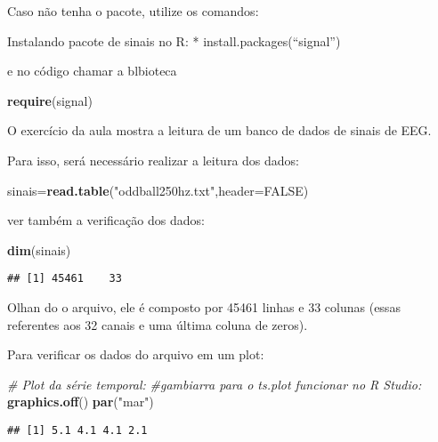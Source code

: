 \documentclass[]{article}
\newenvironment{Shaded}{\begin{snugshade}}{\end{snugshade}}
\newcommand{\KeywordTok}[1]{\textcolor[rgb]{0.13,0.29,0.53}{\textbf{#1}}}
\newcommand{\DataTypeTok}[1]{\textcolor[rgb]{0.13,0.29,0.53}{#1}}
\newcommand{\StringTok}[1]{\textcolor[rgb]{0.31,0.60,0.02}{#1}}
\newcommand{\CommentTok}[1]{\textcolor[rgb]{0.56,0.35,0.01}{\textit{#1}}}
\newcommand{\OtherTok}[1]{\textcolor[rgb]{0.56,0.35,0.01}{#1}}
\newcommand{\NormalTok}[1]{#1}
\begin{document}
Caso não tenha o pacote, utilize os comandos:

Instalando pacote de sinais no R: * install.packages(``signal'')

e no código chamar a blbioteca

\begin{Shaded}
\begin{Highlighting}[]
\KeywordTok{require}\NormalTok{(signal)}
\end{Highlighting}
\end{Shaded}

O exercício da aula mostra a leitura de um banco de dados de sinais de
EEG.

Para isso, será necessário realizar a leitura dos dados:

\begin{Shaded}
\begin{Highlighting}[]
\NormalTok{sinais=}\KeywordTok{read.table}\NormalTok{(}\StringTok{"oddball250hz.txt"}\NormalTok{,}\DataTypeTok{header=}\OtherTok{FALSE}\NormalTok{)}
\end{Highlighting}
\end{Shaded}

ver também a verificação dos dados:

\begin{Shaded}
\begin{Highlighting}[]
\KeywordTok{dim}\NormalTok{(sinais)}
\end{Highlighting}
\end{Shaded}

\begin{verbatim}
## [1] 45461    33
\end{verbatim}

Olhan do o arquivo, ele é composto por 45461 linhas e 33 colunas (essas
referentes aos 32 canais e uma última coluna de zeros).

Para verificar os dados do arquivo em um plot:

\begin{Shaded}
\begin{Highlighting}[]
\CommentTok{# Plot da série temporal:}
\CommentTok{#gambiarra para o ts.plot funcionar no R Studio:}
\KeywordTok{graphics.off}\NormalTok{()}
\KeywordTok{par}\NormalTok{(}\StringTok{"mar"}\NormalTok{)}
\end{Highlighting}
\end{Shaded}

\begin{verbatim}
## [1] 5.1 4.1 4.1 2.1
\end{verbatim}
\end{document}
